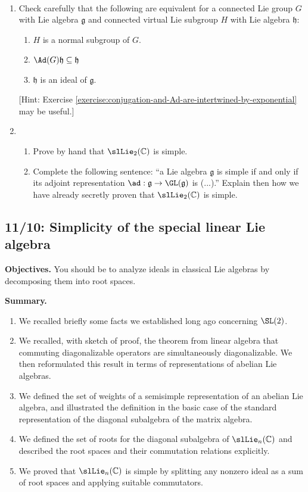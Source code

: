 \documentclass[reqno]{amsart} 
\begin{document}
\begin{homework}
~
  \begin{enumerate}
  \item
    Check carefully
    that the following are equivalent
    for a connected Lie group $G$ with Lie algebra
    $\mathfrak{g}$ and connected virtual Lie subgroup $H$
    with Lie algebra $\mathfrak{h}$:
    \begin{enumerate}
    \item $H$ is a normal subgroup of $G$.
    \item $\Ad(G) \mathfrak{h} \subseteq \mathfrak{h}$
    \item $\mathfrak{h}$ is an ideal of $\mathfrak{g}$.
    \end{enumerate}
    [Hint:
    Exercise
    \ref{exercise:conjugation-and-Ad-are-intertwined-by-exponential}
    may be useful.]
  \item
    \begin{enumerate}
    \item Prove by hand that $\slLie_2(\mathbb{C})$ is simple.
    \item Complete the following sentence: ``a Lie algebra
      $\mathfrak{g}$ is simple if and only if its adjoint
      representation
      $\ad : \mathfrak{g} \rightarrow \GL(\mathfrak{g})$ is
      (...).''  Explain then how we have already secretly proven
      that $\slLie_2(\mathbb{C})$ is simple.
    \end{enumerate}
  \end{enumerate}
\end{homework}

\newpage
\subsection{11/10: Simplicity of the special linear Lie algebra}
\label{sec:orgf1075d9}
\textbf{Objectives.} You should be to analyze ideals in classical Lie
algebras by decomposing them into root spaces.

\textbf{Summary.}
\begin{enumerate}
\item We recalled briefly some facts we established long ago concerning
\(\SL(2)\).
\item We recalled, with sketch of proof, the theorem from linear algebra
that commuting diagonalizable operators are simultaneously
diagonalizable.  We then reformulated this result in terms of
representations of abelian Lie algebras.
\item We defined the set of weights of a semisimple representation of an
abelian Lie algebra, and illustrated the definition in the basic
case of the standard representation of the diagonal subalgebra of
the matrix algebra.
\item We defined the set of roots for the diagonal subalgebra of
\(\slLie_n(\mathbb{C})\) and described the root spaces and their
commutation relations explicitly.
\item We proved that \(\slLie_n(\mathbb{C})\) is simple by splitting any
nonzero ideal as a sum of root spaces and
applying suitable commutators.
\end{enumerate}
\end{document}
